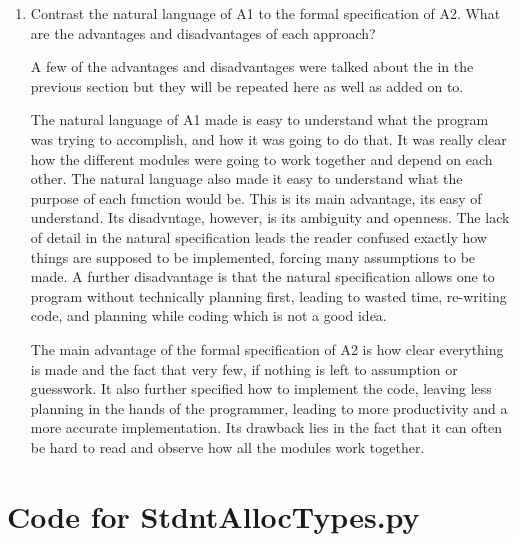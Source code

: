 \documentclass[12pt]{article}
\begin{document}
\begin{enumerate}

\item Contrast the natural language of A1 to the formal specification of A2.
What are the advantages and disadvantages of each approach?

A few of the advantages and disadvantages were talked about the in the previous
section but they will be repeated here as well as added on to.

The natural language of A1 made is easy to understand what the program was
trying to accomplish, and how it was going to do that. It was really clear
how the different modules were going to work together and depend on each
other. The natural language also made it easy to understand what the purpose
of each function would be. This is its main advantage, its easy of understand.
Its disadvntage, however, is its ambiguity and openness. The lack of detail
in the natural specification leads the reader confused exactly how things
are supposed to be implemented, forcing many assumptions to be made. A further
disadvantage is that the natural specification allows one to program without
technically planning first, leading to wasted time, re-writing code,
and planning while coding which is not a good idea.

The main advantage of the formal specification of A2 is how clear everything is
made and the fact that very few, if nothing is left to assumption or guesswork.
It also further specified how to implement the code, leaving less planning
in the hands of the programmer, leading to more productivity and a more accurate
implementation. Its drawback lies in the fact that it can often be hard to read
and observe how all the modules work together.

\end{enumerate}

\newpage

\lstset{language=Python, basicstyle=\tiny, breaklines=true, showspaces=false,
  showstringspaces=false, breakatwhitespace=true}

\def\thesection{\Alph{section}}

\section{Code for StdntAllocTypes.py}

\noindent 
\end{document}
